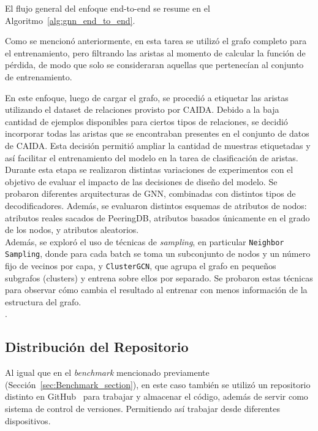 El flujo general del enfoque end-to-end se resume en el Algoritmo~\ref{alg:gnn_end_to_end}.






Como se mencionó anteriormente, en esta tarea se utilizó el grafo completo para el entrenamiento, pero filtrando las aristas al momento de calcular la función de pérdida, de modo que solo se consideraran aquellas que pertenecían al conjunto de entrenamiento.

En este enfoque, luego de cargar el grafo, se procedió a etiquetar las aristas utilizando el dataset de relaciones provisto por CAIDA. Debido a la baja cantidad de ejemplos disponibles para ciertos tipos de relaciones, se decidió incorporar todas las aristas que se encontraban presentes en el conjunto de datos de CAIDA. Esta decisión permitió ampliar la cantidad de muestras etiquetadas y así facilitar el entrenamiento del modelo en la tarea de clasificación de aristas.\\

Durante esta etapa se realizaron distintas variaciones de experimentos con el objetivo de evaluar el impacto de las decisiones de diseño del modelo. Se probaron diferentes arquitecturas de GNN, combinadas con distintos tipos de decodificadores. Además, se evaluaron distintos esquemas de atributos de nodos: atributos reales sacados de PeeringDB, atributos basados únicamente en el grado de los nodos, y atributos aleatorios.\\

Además, se exploró el uso de técnicas de \textit{sampling}, en particular \texttt{Neighbor Sampling}, donde para cada batch se toma un subconjunto de nodos y un número fijo de vecinos por capa, y \texttt{ClusterGCN}, que agrupa el grafo en pequeños subgrafos (clusters) y entrena sobre ellos por separado.
Se probaron estas técnicas para observar cómo cambia el resultado al entrenar con menos información de la estructura del grafo.\\





.







\subsection{Distribución del Repositorio}

Al igual que en el \textit{benchmark} mencionado previamente (Sección~\ref{sec:Benchmark_section}), en este caso también se utilizó un repositorio distinto en GitHub~\cite{gnnCode} para trabajar y almacenar el código, además de servir como sistema de control de versiones. Permitiendo así trabajar desde diferentes dispositivos.\\



